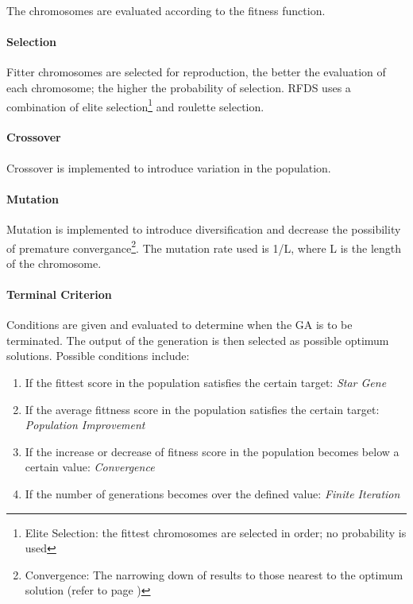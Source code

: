 The chromosomes are evaluated according to the fitness function.

\paragraph{Selection}\mbox{}

Fitter chromosomes are selected for reproduction, the better the evaluation of each chromosome; the higher the probability of selection. RFDS uses a combination of elite selection\footnote{Elite Selection: the fittest chromosomes are selected in order; no probability is used} and roulette selection.

\paragraph{Crossover}\mbox{}

Crossover is implemented to introduce variation in the population.

\paragraph{Mutation}\mbox{}

Mutation is implemented to introduce diversification and decrease the possibility of premature convergance\footnote{Convergence: The narrowing down of results to those nearest to the optimum solution (refer to page \pageref{sec:GAConvergence})}. The mutation rate used is 1/L, where L is the length of the chromosome.

\paragraph{Terminal Criterion}\mbox{}

Conditions are given and evaluated to determine when the GA is to be terminated. The output of the generation is then selected as possible optimum solutions. Possible conditions include:

\begin{enumerate}
\item If the fittest score in the population satisfies the certain target: \emph{Star Gene}
\item If the average fittness score in the population satisfies the certain target: \emph{Population Improvement}
\item If the increase or decrease of fitness score in the population becomes below a certain value: \emph{Convergence}
\item If the number of generations becomes over the defined value: \emph{Finite Iteration} 
\end{enumerate}

